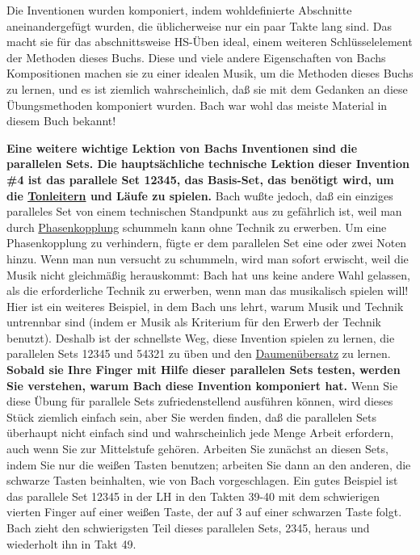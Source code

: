 Die Inventionen wurden komponiert, indem wohldefinierte Abschnitte aneinandergefügt wurden, die üblicherweise nur ein paar Takte lang sind.
Das macht sie für das abschnittsweise HS-Üben ideal, einem weiteren Schlüsselelement der Methoden dieses Buchs.
Diese und viele andere Eigenschaften von Bachs Kompositionen machen sie zu einer idealen Musik, um die Methoden dieses Buchs zu lernen, und es ist ziemlich wahrscheinlich, daß sie mit dem Gedanken an diese Übungsmethoden komponiert wurden.
Bach war wohl das meiste Material in diesem Buch bekannt!

\textbf{Eine weitere wichtige Lektion von Bachs Inventionen sind die parallelen Sets.
Die hauptsächliche technische Lektion dieser Invention \#4 ist das parallele Set 12345, das Basis-Set, das benötigt wird, um die \hyperlink{c1iii5}{Tonleitern} und Läufe zu spielen.}
Bach wußte jedoch, daß ein einziges paralleles Set von einem technischen Standpunkt aus zu gefährlich ist, weil man durch \hyperlink{c1iii7b2}{Phasenkopplung} schummeln kann ohne Technik zu erwerben.
Um eine Phasenkopplung zu verhindern, fügte er dem parallelen Set eine oder zwei Noten hinzu.
Wenn man nun versucht zu schummeln, wird man sofort erwischt, weil die Musik nicht gleichmäßig herauskommt: Bach hat uns keine andere Wahl gelassen, als die erforderliche Technik zu erwerben, wenn man das musikalisch spielen will!
Hier ist ein weiteres Beispiel, in dem Bach uns lehrt, warum Musik und Technik untrennbar sind (indem er Musik als Kriterium für den Erwerb der Technik benutzt).
Deshalb ist der schnellste Weg, diese Invention spielen zu lernen, die parallelen Sets 12345 und 54321 zu üben und den \hyperlink{c1iii5b}{Daumenübersatz} zu lernen.
\textbf{Sobald sie Ihre Finger mit Hilfe dieser parallelen Sets testen, werden Sie verstehen, warum Bach diese Invention komponiert hat.}
Wenn Sie diese Übung für parallele Sets zufriedenstellend ausführen können, wird dieses Stück ziemlich einfach sein, aber Sie werden finden, daß die parallelen Sets überhaupt nicht einfach sind und wahrscheinlich jede Menge Arbeit erfordern, auch wenn Sie zur Mittelstufe gehören.
Arbeiten Sie zunächst an diesen Sets, indem Sie nur die weißen Tasten benutzen; arbeiten Sie dann an den anderen, die schwarze Tasten beinhalten, wie von Bach vorgeschlagen.
Ein gutes Beispiel ist das parallele Set 12345 in der LH in den Takten 39-40 mit dem schwierigen vierten Finger auf einer weißen Taste, der auf 3 auf einer schwarzen Taste folgt.
Bach zieht den schwierigsten Teil dieses parallelen Sets, 2345, heraus und wiederholt ihn in Takt 49.

